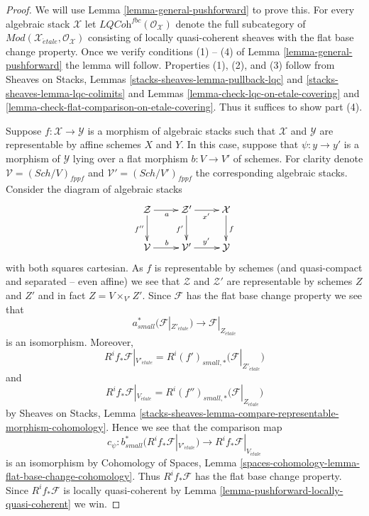\documentclass[10pt,a4paper]{amsart}
\theoremstyle{plain}
\theoremstyle{definition}
\theoremstyle{remark}
\numberwithin{equation}{subsection}
\def\Sch{\mathit{Sch}}
\def\etale{{\acute{e}tale}}
\begin{document}
\begin{proof}
We will use
Lemma \ref{lemma-general-pushforward}
to prove this. For every algebraic stack $\mathcal{X}$ let
$\textit{LQCoh}^{fbc}(\mathcal{O}_\mathcal{X})$ denote the full subcategory of
$\textit{Mod}(\mathcal{X}_\etale, \mathcal{O}_\mathcal{X})$
consisting of locally quasi-coherent sheaves with the flat base
change property. Once we verify conditions (1) -- (4) of
Lemma \ref{lemma-general-pushforward}
the lemma will follow. Properties (1), (2), and (3) follow from
Sheaves on Stacks, Lemmas \ref{stacks-sheaves-lemma-pullback-lqc} and
\ref{stacks-sheaves-lemma-lqc-colimits}
and
Lemmas \ref{lemma-check-lqc-on-etale-covering} and
\ref{lemma-check-flat-comparison-on-etale-covering}.
Thus it suffices to show part (4).

\medskip\noindent
Suppose $f : \mathcal{X} \to \mathcal{Y}$ is a morphism of algebraic stacks
such that $\mathcal{X}$ and $\mathcal{Y}$ are representable by affine
schemes $X$ and $Y$. In this case, suppose that
$\psi : y \to y'$ is a morphism of $\mathcal{Y}$ lying over
a flat morphism $b : V \to V'$ of schemes. For clarity denote
$\mathcal{V} = (\Sch/V)_{fppf}$ and $\mathcal{V}' = (\Sch/V')_{fppf}$
the corresponding algebraic stacks. Consider the diagram
of algebraic stacks
$$
\xymatrix{
\mathcal{Z} \ar[d]_{f''} \ar[r]_a &
\mathcal{Z}' \ar[r]_{x'} \ar[d]_{f'} & \mathcal{X} \ar[d]^f \\
\mathcal{V} \ar[r]^b & \mathcal{V}' \ar[r]^{y'} & \mathcal{Y}
}
$$
with both squares cartesian. As $f$ is representable by schemes
(and quasi-compact and separated -- even affine) we see that $\mathcal{Z}$ and
$\mathcal{Z}'$ are representable by schemes $Z$ and $Z'$ and in
fact $Z = V \times_{V'} Z'$. Since $\mathcal{F}$ has the flat
base change property we see that
$$
a_{small}^*\big(\mathcal{F}|_{Z'_\etale}\big)
\longrightarrow
\mathcal{F}|_{Z_\etale}
$$
is an isomorphism. Moreover,
$$
R^if_*\mathcal{F}|_{V'_\etale} =
R^i(f')_{small, *}\big(\mathcal{F}|_{Z'_\etale}\big)
$$
and
$$
R^if_*\mathcal{F}|_{V_\etale} =
R^i(f'')_{small, *}\big(\mathcal{F}|_{Z_\etale}\big)
$$
by
Sheaves on Stacks, Lemma
\ref{stacks-sheaves-lemma-compare-representable-morphism-cohomology}.
Hence we see that the comparison map
$$
c_\psi :
b_{small}^*(R^if_*\mathcal{F}|_{V'_\etale})
\longrightarrow
R^if_*\mathcal{F}|_{V_\etale}
$$
is an isomorphism by
Cohomology of Spaces, Lemma
\ref{spaces-cohomology-lemma-flat-base-change-cohomology}.
Thus $R^if_*\mathcal{F}$ has the flat base change property.
Since $R^if_*\mathcal{F}$ is locally quasi-coherent by
Lemma \ref{lemma-pushforward-locally-quasi-coherent}
we win.
\end{proof}
\end{document}
